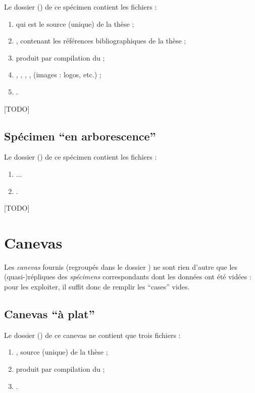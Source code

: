 Le dossier () de ce spécimen contient les fichiers :
\begin{enumerate}
\item {} qui est le source  (unique) de la thèse ;
\item {}, contenant les références bibliographiques de
  la thèse ;
\item {} produit par compilation du  ;
\item {}, , , ,
   (images : logos, etc.) ;
\item {}.
\end{enumerate}

[TODO]

\subsection{Spécimen \enquote{en arborescence}}
\label{sec-specimen-arborescence}
%
%
%

Le dossier () de ce spécimen contient les
fichiers :
\begin{enumerate}
\item ...
\item {}.
\end{enumerate}

[TODO]

\section{Canevas}
\label{sec-canevas}

Les \emph{canevas} fournis (regroupés dans le dossier ) ne sont
rien d'autre que les (quasi-)répliques des \emph{spécimens} correspondants dont
les données ont été vidées : pour les exploiter, il suffit donc de remplir les
\enquote{cases} vides.

\subsection{Canevas \enquote{à plat}}
\label{sec-canevas-a-plat}
%

Le dossier () de ce canevas ne contient que trois fichiers :
\begin{enumerate}
\item {}, source  (unique) de la thèse  ;
\item {} produit par compilation du  ;
\item {}.
\end{enumerate}

